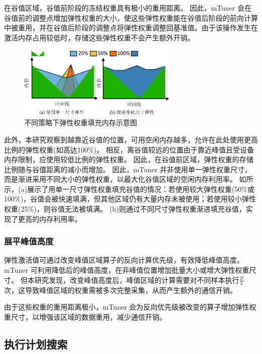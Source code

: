 在谷值区域，谷值前阶段的冻结权重具有极小的重用距离。
因此，mTuner 会在谷值前的调整点增加弹性权重的大小，使这些弹性权重能在谷值后阶段的前向计算中被重用，并在谷值后阶段的调整点将弹性权重调整回基准值。由于该操作发生在激活内存占用较低时，存储这些弹性权重不会产生额外开销。

\begin{figure}[ht]
\centerline{\includegraphics[width=0.68\textwidth]{figures/mtuner/progressive-crop.pdf}}
\caption{不同策略下弹性权重填充内存示意图}
\label{fig:progressive}
\end{figure}

此外，本研究观察到越靠近谷值的位置，可用空闲内存越多，允许在此处使用更高比例的弹性权重(如高达100\%)。
相反，离谷值较远的位置由于靠近峰值且受设备内存限制，应使用较低比例的弹性权重。
因此，在谷值前区域，弹性权重的存储比例随与谷值距离的减小而增加。  
因此，mTuner 并非使用单一弹性权重尺寸，而是渐进采用不同大小的弹性权重，以最大化谷值区域的空闲内存利用率。
如所示，(a)展示了用单一尺寸弹性权重填充谷值的情况：若使用较大弹性权重(50\%或100\%)，谷值会被快速填满，但其他区域仍有大量内存未被使用；若使用较小弹性权重(25\%)，则谷值无法被填满。
(b)则通过不同尺寸弹性权重渐进填充谷值，实现了更高的内存利用率。

\subsubsection{展平峰值高度}

弹性激活值可通过改变峰值区域算子的反向计算优先级，有效降低峰值高度。mTuner 可利用降低后的峰值高度，在非峰值位置增加批量大小或增大弹性权重尺寸。  
但本研究发现，改变峰值高度后，峰值区域的计算需要对不同样本执行$\frac{B}{b}$次，这导致峰值区域的权重需被多次完整采集，从而产生额外的通信开销。  

由于这些权重的重用距离极小，mTuner 会为反向优先级被改变的算子增加弹性权重尺寸，以增强该区域的数据重用，减少通信开销。


\subsection{执行计划搜索}

